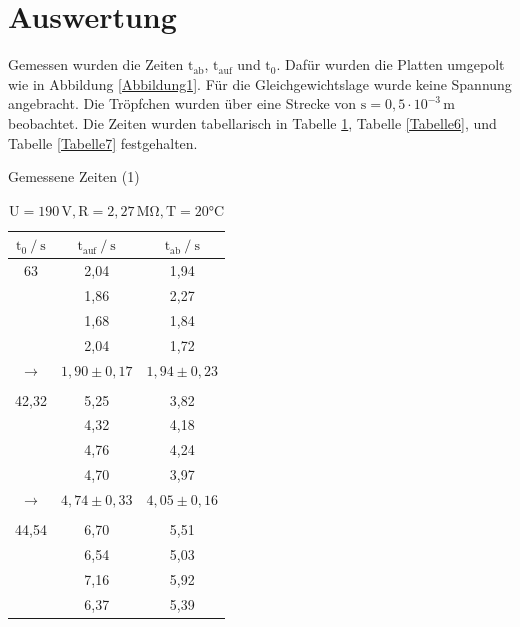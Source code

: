 \section{Auswertung} 

\begin{flushleft}
    Gemessen wurden die Zeiten $\text{t}_{\text{ab}}$, $\text{t}_{\text{auf}}$ und $\text{t}_{0}$. 
    Dafür wurden die Platten umgepolt wie in Abbildung \ref{Abbildung1}. 
    Für die Gleichgewichtslage wurde keine Spannung angebracht.
    Die Tröpfchen wurden über eine Strecke von   $\text{s}= 0,5 \cdot 10^{-3}\,\unit{\meter}$ beobachtet.
    Die Zeiten wurden tabellarisch in Tabelle \ref{Tabelle1}, Tabelle \ref{Tabelle6}, und Tabelle \ref{Tabelle7} festgehalten. 
\end{flushleft}

\begin{table} [H]
    \caption{Gemessene Zeiten (1)}
    \label{Tabelle1}
    \begin{subtable}[c]{0.5\textwidth}
    \centering
    \caption{$\text{U} = 190\,\text{V}, \text{R} = 2,27\,\unit{\mega\ohm}, \text{T} = 20\unit{\celsius}  $}
    \begin{tabular}{ c|c|c}
        \toprule
        {$\text{t}_{0} \mathbin{/}\unit{\second} $}&
        {$\text{t}_{\text{auf}} \mathbin{/}\unit{\second} $}&
        {$\text{t}_{\text{ab}} \mathbin{/}\unit{\second} $}\\
        \midrule
        63  & 2,04 & 1,94 \\
            & 1,86 & 2,27 \\
            & 1,68 & 1,84 \\
            & 2,04 & 1,72 \\
        \rowcolor{gray}$\to$ & $1,90 \pm 0,17$ & $1,94 \pm 0,23$ \\
            &  &  \\
        42,32 & 5,25 & 3,82\\
            & 4,32 & 4,18 \\
            & 4,76 & 4,24\\
            & 4,70 & 3,97 \\
        \rowcolor{gray}$\to$ & $4,74 \pm 0,33$ & $4,05 \pm 0,16$ \\
            &  &  \\
        44,54 & 6,70 & 5,51 \\
            & 6,54 & 5,03 \\
            & 7,16 & 5,92 \\
            & 6,37 & 5,39 \\

\end{tabular}
\end{subtable}
\end{table}
